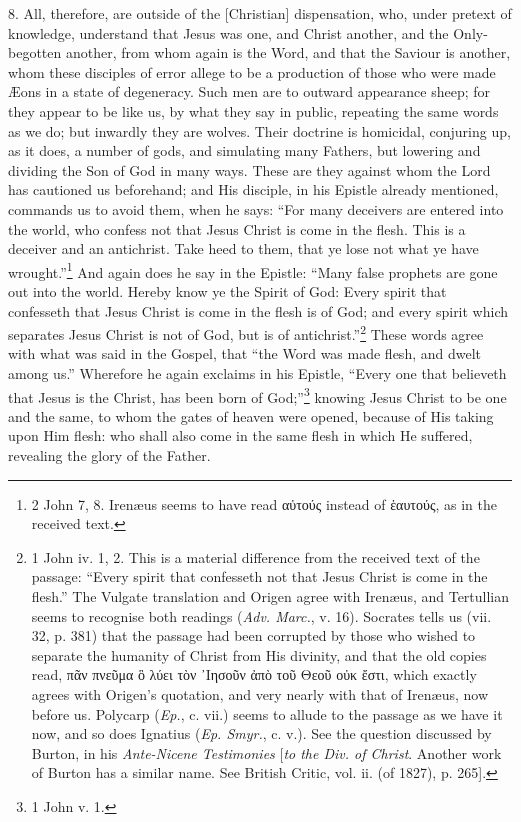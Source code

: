 8. All, therefore, are outside of the [Christian] dispensation, who, under pretext of knowledge, understand that Jesus was one, and Christ another, and the Only-begotten another, from whom again is the Word, and that the Saviour is another, whom these disciples of error allege to be a production of those who were made Æons in a state of degeneracy. Such men are to outward appearance sheep; for they appear to be like us, by what they say in public, repeating the same words as we do; but inwardly they are wolves. Their doctrine is homicidal, conjuring up, as it does, a number of gods, and simulating many Fathers, but lowering and dividing the Son of God in many ways. These are they against whom the Lord has cautioned us beforehand; and His disciple, in his Epistle already mentioned, commands us to avoid them, when he says: “For many deceivers are entered into the world, who confess not that Jesus Christ is come in the flesh. This is a deceiver and an antichrist. Take heed to them, that ye lose not what ye have wrought.”\footnote{2 John 7, 8. Irenæus seems to have read \textgreek{αὐτούς} instead of \textgreek{ἑαυτούς}, as in the received text.} And again does he say in the Epistle: “Many false prophets are gone out into the world. Hereby know ye the Spirit of God: Every spirit that confesseth that Jesus Christ is come in the flesh is of God; and every spirit which separates Jesus Christ is not of God, but is of antichrist.”\footnote{1 John iv. 1, 2. This is a material difference from the received text of the passage: “Every spirit that confesseth not that Jesus Christ is come in the flesh.” The Vulgate translation and Origen agree with Irenæus, and Tertullian seems to recognise both readings (\emph{Adv. Marc.}, v. 16). Socrates tells us (vii. 32, p. 381) that the passage had been corrupted by those who wished to separate the humanity of Christ from His divinity, and that the old copies read, \textgreek{πᾶν πνεῦμα ὃ λύει τὸν ᾽Ιησοῦν ἀπὸ τοῦ Θεοῦ οὐκ ἔστι}, which exactly agrees with Origen’s quotation, and very nearly with that of Irenæus, now before us. Polycarp (\emph{Ep.}, c. vii.) seems to allude to the passage as we have it now, and so does Ignatius (\emph{Ep. Smyr.}, c. v.). See the question discussed by Burton, in his \emph{Ante-Nicene Testimonies} [\emph{to the Div. of Christ}. Another work of Burton has a similar name. See British Critic, vol. ii. (of 1827), p. 265].} These words agree with what was said in the Gospel, that “the Word was made flesh, and dwelt among us.” Wherefore he again exclaims in his Epistle, “Every one that believeth that Jesus is the Christ, has been born of God;”\footnote{1 John v. 1.} knowing Jesus Christ to be one and the same, to whom the gates of heaven were opened, because of His taking upon Him flesh: who shall also come in the same flesh in which He suffered, revealing the glory of the Father.

